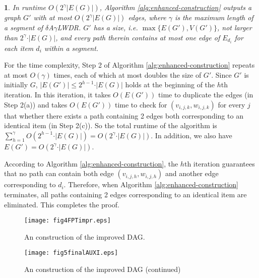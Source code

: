 \documentclass[11pt,english,onecolumn,draftcls]{IEEEtran}
\theoremstyle{plain}
\theoremstyle{plain}
\theoremstyle{plain}
\newtheorem{lem}[thm]{\protect\lemmaname}
\theoremstyle{plain}
\providecommand{\lemmaname}{Lemma}
\begin{document}
\begin{lem}
\label{lem:timeofalgf}In runtime $O(2^{\gamma}\vert E(G)\vert)$,
Algorithm \ref{alg:enhanced-construction} outputs a graph $G'$ with
at most $O(2^{\gamma}\vert E(G)\vert)$ edges, where $\gamma$ is
the maximum length of a segment of $\delta$A$\gamma$LWDR. $G'$
has a size, i.e. $\max\{E(G'),V(G')\}$, not larger than $2^{\gamma}\cdot\vert E(G)\vert$,
and every path therein contains at most one edge of $E_{d_{i}}$ for
each item $d_{i}$ within a segment. \end{lem}
\begin{IEEEproof}
For the time complexity, Step 2 of Algorithm \ref{alg:enhanced-construction}
repeats at most $O(\gamma)$ times, each of which at most doubles
the size of $G'$. Since $G'$ is initially $G$, $\vert E(G')\vert\leq2^{h-1}\cdot\vert E(G)\vert$
holds at the beginning of the $h$th iteration. In this iteration,
it takes $O(E(G'))$ time to duplicate the edges (in Step 2(a)) and
takes $O(E(G'))$ time to check for $(v_{i,j,k},w_{i,j,k})$ for every
$j$ that whether there exists a path containing 2 edges both corresponding
to an identical item (in Step 2(c)). So the total runtime of the algorithm
is $\sum_{h=1}^{\gamma}O(2^{h-1}\cdot\vert E(G)\vert)=O(2^{\gamma}\cdot\vert E(G)\vert)$.
In addition, we also have $E(G')=O(2^{\gamma}\cdot\vert E(G)\vert)$.

According to Algorithm \ref{alg:enhanced-construction}, the $h$th
iteration guarantees that no path can contain both edge $(v_{i,j,h},w{}_{i,j,h})$
and another edge corresponding to $d_{i}$. Therefore, when Algorithm
\ref{alg:enhanced-construction} terminates, all paths containing
2 edges corresponding to an identical item are eliminated. This completes
the proof.
\end{IEEEproof}
\begin{figure}
\texttt{[image: fig4FPTimpr.eps]}

\protect\caption{\label{fig:oneoccuranceitem}An construction of the improved DAG.}
\end{figure}


\begin{figure}
\texttt{[image: fig5finalAUXI.eps]}

\protect\caption{\label{fig:oneoccuranceitem-1}An construction of the improved DAG
(continued)}
\end{figure}
\end{document}
